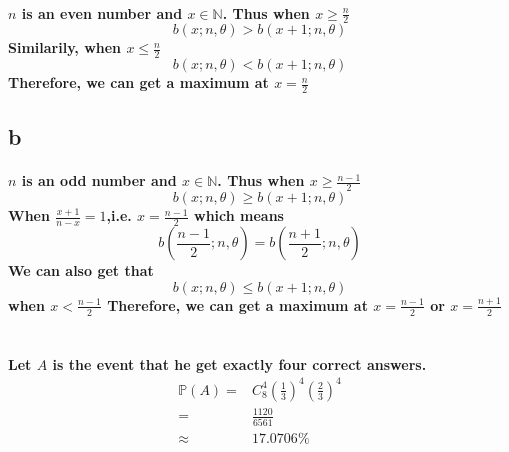 \documentclass{article}
\begin{document}
        \paragraph{
            $n$ is an even number and $x \in \mathbb{N}$.
            Thus when
            $x\geq\frac{n}{2}$
            $$b(x;n,\theta)>b(x+1;n,\theta)$$
            Similarily, when $x\leq\frac{n}{2}$
            $$b(x;n,\theta)<b(x+1;n,\theta)$$
            Therefore, we can get a maximum at $x=\frac{n}{2}$
        }
        \subsection*{b}
        \paragraph{
            $n$ is an odd number and $x \in \mathbb{N}$.
            Thus when $x\geq\frac{n-1}{2}$
            $$b(x;n,\theta)\geq b(x+1;n,\theta)$$
            When $\frac{x+1}{n-x}=1$,i.e. $x=\frac{n-1}{2}$
            which means $$b(\frac{n-1}{2};n,\theta)=b(\frac{n+1}{2};n,\theta)$$
            We can also get that 
            $$b(x;n,\theta)\leq b(x+1;n,\theta)$$
            when $x<\frac{n-1}{2}$
            Therefore, we can get a maximum at $x=\frac{n-1}{2}$ or $x=\frac{n+1}{2}$
        }
    \section{}
        \paragraph{
            Let $A$ is the event that he get exactly four correct answers.
            \begin{equation*}
                \begin{split}
                    \mathbb{P}(A)=&C_8^4 (\frac{1}{3})^4(\frac{2}{3})^4\\
                        =&\frac{1120}{6561}\\
                        \approx& 17.0706\%
                \end{split}
            \end{equation*}
        }
    
    \section{}
\end{document}
